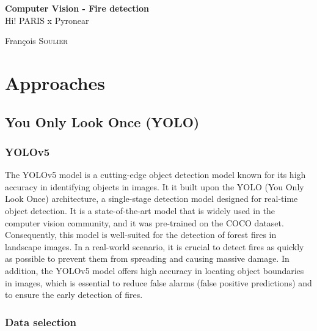 \documentclass{article}
\begin{document}
\begin{titlepage}
\begin{center}


{ {\huge \bfseries Computer Vision - Fire detection}\\[0.4cm]
    \LARGE Hi! PARIS x Pyronear}

\vfill

\begin{minipage}{0.5\textwidth}
    \large
    \centering
    François \textsc{Soulier}
\end{minipage}

\end{center}
\end{titlepage}

\tableofcontents
\thispagestyle{empty}
\newpage
\setcounter{page}{1}

\section{Approaches}

\subsection{You Only Look Once (YOLO)}

\subsubsection{YOLOv5}

The YOLOv5 model is a cutting-edge object detection model known for its high accuracy in identifying objects in images. It it built upon the YOLO (You Only Look Once) architecture, a single-stage detection model designed for real-time object detection. It is a state-of-the-art model that is widely used in the computer vision community, and it was pre-trained on the COCO dataset.\\

Consequently, this model is well-suited for the detection of forest fires in landscape images. In a real-world scenario, it is crucial to detect fires as quickly as possible to prevent them from spreading and causing massive damage. In addition, the YOLOv5 model offers high accuracy in locating object boundaries in images, which is essential to reduce false alarms (false positive predictions) and to ensure the early detection of fires.

\subsubsection{Data selection}
\end{document}
